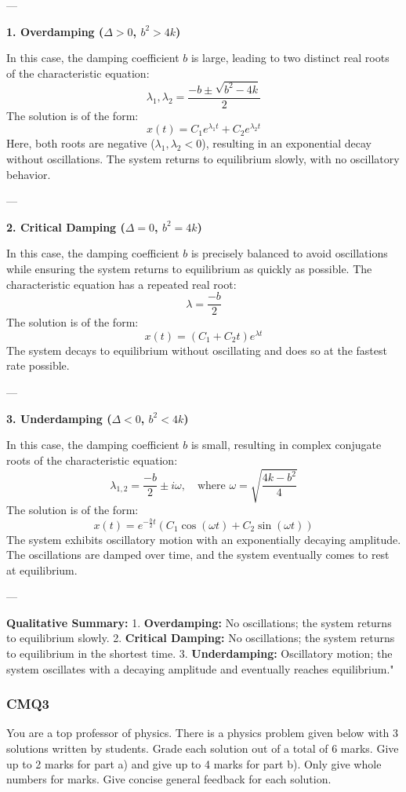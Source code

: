 ---

\textbf{1. Overdamping (\(\Delta > 0\), \(b^2 > 4k\))}

In this case, the damping coefficient \(b\) is large, leading to two distinct real roots of the characteristic equation:
\[
\lambda_1, \lambda_2 = \frac{-b \pm \sqrt{b^2 - 4k}}{2}
\]
The solution is of the form:
\[
x(t) = C_1 e^{\lambda_1 t} + C_2 e^{\lambda_2 t}
\]
Here, both roots are negative (\(\lambda_1, \lambda_2 < 0\)), resulting in an exponential decay without oscillations. The system returns to equilibrium slowly, with no oscillatory behavior.

---

\textbf{2. Critical Damping (\(\Delta = 0\), \(b^2 = 4k\))}

In this case, the damping coefficient \(b\) is precisely balanced to avoid oscillations while ensuring the system returns to equilibrium as quickly as possible. The characteristic equation has a repeated real root:
\[
\lambda = \frac{-b}{2}
\]
The solution is of the form:
\[
x(t) = (C_1 + C_2 t) e^{\lambda t}
\]
The system decays to equilibrium without oscillating and does so at the fastest rate possible.

---

\textbf{3. Underdamping (\(\Delta < 0\), \(b^2 < 4k\))}

In this case, the damping coefficient \(b\) is small, resulting in complex conjugate roots of the characteristic equation:
\[
\lambda_{1,2} = \frac{-b}{2} \pm i \omega, \quad \text{where } \omega = \sqrt{\frac{4k - b^2}{4}}
\]
The solution is of the form:
\[
x(t) = e^{-\frac{b}{2}t} \left(C_1 \cos(\omega t) + C_2 \sin(\omega t)\right)
\]
The system exhibits oscillatory motion with an exponentially decaying amplitude. The oscillations are damped over time, and the system eventually comes to rest at equilibrium.

---

\textbf{Qualitative Summary:}
1. \textbf{Overdamping:} No oscillations; the system returns to equilibrium slowly.
2. \textbf{Critical Damping:} No oscillations; the system returns to equilibrium in the shortest time.
3. \textbf{Underdamping:} Oscillatory motion; the system oscillates with a decaying amplitude and eventually reaches equilibrium."


\subsubsection{CMQ3}

You are a top professor of physics. There is a physics problem given below with 3 solutions written by students. Grade each solution out of a total of 6 marks. Give up to 2 marks for part a) and give up to 4 marks for part b). Only give whole numbers for marks. Give concise general feedback for each solution.

